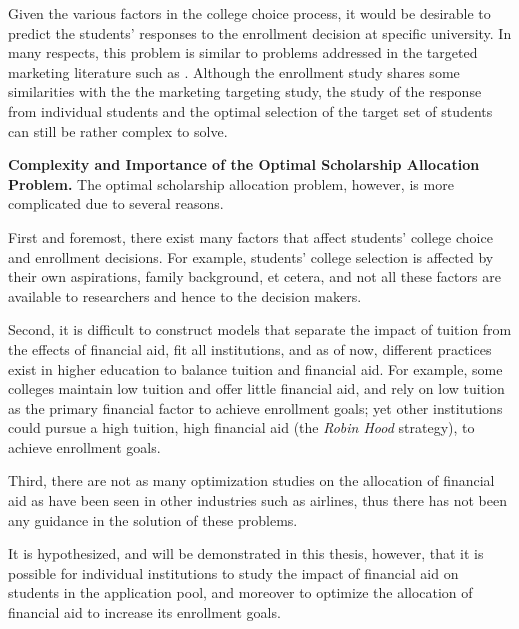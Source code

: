 \documentclass[12pt,english]{report}
\begin{document}
Given the various factors in the college choice process, it would be desirable to predict the students' 
responses to the enrollment decision at specific university.  In many respects, this problem is similar to 
problems addressed in the targeted marketing literature such as \citep{Reinartz2003}. Although the enrollment study shares
some similarities with the the marketing targeting study,  the study of the response from individual students and the optimal 
selection of the target set of students can still be rather complex to solve.


\vspace*{.15in} 
\noindent \textbf{Complexity and Importance of the Optimal Scholarship Allocation Problem.}
The optimal scholarship allocation problem, however, is more complicated due to several reasons. 

First and foremost, there exist many factors that affect students' college choice and enrollment decisions. For example, students' college selection is affected by their own aspirations, family background, et cetera, and not all these factors are available to researchers and hence to the decision makers. %

Second, it is difficult to construct models that separate the impact of tuition from the effects of financial aid, fit all institutions, and as of now, different practices exist in higher education to balance tuition and financial aid. For example, some colleges maintain low tuition and offer little financial aid, and rely on low tuition as the primary financial factor to achieve enrollment goals; yet other institutions could pursue a high tuition, high financial aid (the \textit{Robin Hood} strategy), to achieve enrollment goals.

Third, there are not as many optimization studies on the allocation of financial aid as have been seen in other industries such as airlines, thus there has not been any guidance in the solution of these problems. 

\vspace*{.15in}  
It is hypothesized, and will be demonstrated in this thesis, however, that it is possible for individual institutions  to study the impact of financial aid on students in the application pool, and moreover to optimize the allocation of financial aid to increase its enrollment goals. 
\end{document}
